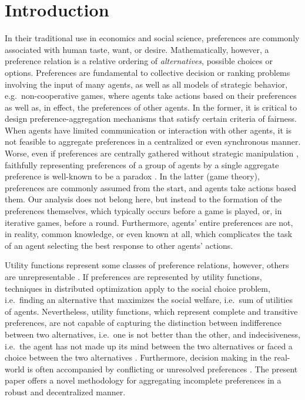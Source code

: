 \documentclass[conference]{ieeeconf}
\begin{document}
\section{Introduction}

In their traditional use in economics and social science, preferences are commonly associated with human taste, want, or desire. Mathematically, however, a preference relation is a relative ordering of \emph{alternatives}, possible choices or options. Preferences are fundamental to collective decision or ranking problems involving the input of many agents, as well as all models of strategic behavior, e.g.~non-cooperative games, where agents take actions based on their preferences as well as, in effect, the preferences of other agents. In the former, it is critical to design preference-aggregation mechanisms that satisfy certain criteria of fairness. When agents have limited communication or interaction with other agents, it is not feasible to aggregate preferences in a centralized or even synchronous manner. Worse, even if preferences are centrally gathered without strategic manipulation \cite{gibbard1973,satterthwaite1975}, faithfully representing preferences of a group of agents by a single aggregate preference is well-known to be a paradox \cite{arrow2012}. In the latter (game theory), preferences are commonly assumed from the start, and agents take actions based them. Our analysis does not belong here, but instead to the formation of the preferences themselves, which typically occurs before a game is played, or, in iterative games, before a round. Furthermore, agents' entire preferences are not, in reality, common knowledge, or even known at all, which complicates the task of an agent selecting the best response to other agents' actions.

Utility functions represent some classes of preference relations, however, others are unrepresentable \cite{Beardon2002}. If preferences are represented by utility functions, techniques in distributed optimization apply to the social choice problem, i.e.~finding an alternative that maximizes the social welfare, i.e.~sum of utilities of agents. Nevertheless, utility functions, which represent complete and transitive preferences, are not capable of capturing the distinction between indifference between two alternatives, i.e.~one is not better than the other, and indecisiveness, i.e.~the agent has not made up its mind between the two alternatives or faced a choice between the two alternatives \cite{eliaz2006}. Furthermore, decision making in the real-world is often accompanied by conflicting or unresolved preferences \cite{levi1990}. The present paper offers a novel methodology for aggregating incomplete preferences in a robust and decentralized manner.
\end{document}
